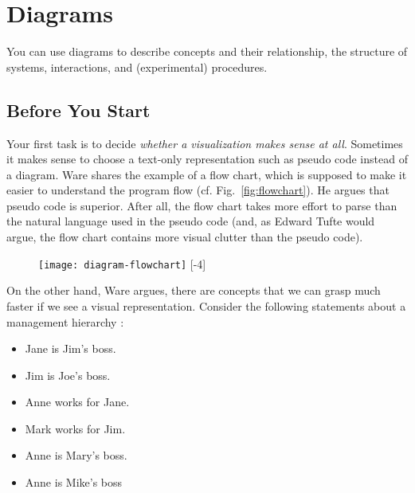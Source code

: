 \section{Diagrams}

You can use diagrams to describe concepts and their relationship, the structure of systems, interactions, and (experimental) procedures.


\subsection{Before You Start}

Your first task is to decide \emph{whether a visualization makes sense at all}. Sometimes it makes sense to choose a text-only representation such as pseudo code instead of a diagram. Ware \cite{Ware12} shares the example of a flow chart, which is supposed to make it easier to understand the program flow (cf. Fig.~\ref{fig:flowchart}). He argues that pseudo code is superior. After all, the flow chart takes more effort to parse than the natural language used in the pseudo code (and, as Edward Tufte would argue, the flow chart contains more visual clutter than the pseudo code).

\begin{figure}[t]
\centering
\texttt{[image: diagram-flowchart]}
[-4\baselineskip]
\end{figure}

On the other hand, Ware argues, there are concepts that we can grasp much faster if we see a visual representation. Consider the following statements about a management hierarchy \cite{Ware12}:

\begin{itemize}
  \item Jane is Jim’s boss.
  \item Jim is Joe’s boss.
  \item Anne works for Jane.
  \item Mark works for Jim.
  \item Anne is Mary’s boss.
  \item Anne is Mike’s boss
\end{itemize}


